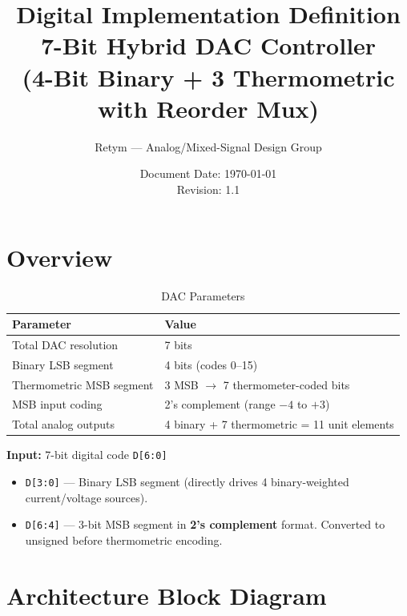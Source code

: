 \documentclass[11pt,a4paper]{article}
\title{
    \vspace{-1cm}
    \textbf{Digital Implementation Definition} \\
    \Large 7-Bit Hybrid DAC Controller \\
    (4-Bit Binary + 3\textrightarrow 7 Thermometric with Reorder Mux)
}
\author{Retym --- Analog/Mixed-Signal Design Group}
\date{Document Date: \today \\ Revision: 1.1}
\begin{document}
\maketitle
\thispagestyle{fancy}

\tableofcontents
\newpage

\section{Overview}

\begin{table}[h]
\centering
\begin{tabular}{@{}ll@{}}
\toprule
\textbf{Parameter}           & \textbf{Value} \\
\midrule
Total DAC resolution         & 7 bits \\
Binary LSB segment           & 4 bits (codes 0--15) \\
Thermometric MSB segment     & 3 MSB $\rightarrow$ 7 thermometer-coded bits \\
MSB input coding             & 2's complement (range $-4$ to $+3$) \\
Total analog outputs         & 4 binary + 7 thermometric = 11 unit elements \\
\bottomrule
\end{tabular}
\caption{DAC Parameters}
\end{table}

\textbf{Input:} 7-bit digital code \texttt{D[6:0]}
\begin{itemize}
    \item \texttt{D[3:0]} --- Binary LSB segment (directly drives 4 binary-weighted current/voltage sources).
    \item \texttt{D[6:4]} --- 3-bit MSB segment in \textbf{2's complement} format. Converted to unsigned before thermometric encoding.
\end{itemize}

\section{Architecture Block Diagram}
\end{document}
